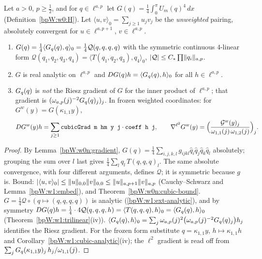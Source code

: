 \begin{proposition}\label{bpW:w1:gradient-identity}
Let $a>0$, $p\ge\frac12$, and for $q\in\ell^{a,p}$ let $G(q)=\frac14\int_0^\pi U_m(q)^4\,dx$ (Definition~\ref{bpW:w0:H}).
Let $\langle u,v\rangle_0=\sum_{j\ge1}u_jv_j$ be the \emph{unweighted} pairing, absolutely convergent for
$u\in\ell^{a,p+1}$, $v\in\ell^{a,p}$.
\begin{enumerate}[label=(\roman*)]
\item $G(q)=\frac14\langle G_q(q),q\rangle_0=\frac14\mathcal Q(q,q,q,q)$ with the symmetric continuous $4$-linear form
  $\mathcal Q(q_1,q_2,q_3,q_4)=\langle T(q_1,q_2,q_3),q_4\rangle_0$, $\lvert \mathcal Q\rvert\le C_*\prod\lVert q_i\rVert_{a,p}$.
\item $G$ is real analytic on $\ell^{a,p}$ and $DG(q)h=\langle G_q(q),h\rangle_0$ for all $h\in\ell^{a,p}$.
\item $G_q(q)$ is \emph{not} the Riesz gradient of $G$ for the inner product of $\ell^{a,p}$; that gradient is
  $(\omega_{a,p}(j)^{-2}G_q(q)_j)_j$. In frozen weighted coordinates: for $G^w(y)=G(\kappa_{1,1}y)$,
  \[DG^w(y)h=\sum_{j\ge1}\texttt{cubicGrad m hm y j}\cdot\texttt{coeff h j},\qquad
  \nabla^{\ell^2}G^w(y)=\Bigl(\frac{\mathcal G^w(y)_j}{\omega_{1,1}(j)\,\omega_{1,2}(j)}\Bigr)_j.\]
\end{enumerate}
\end{proposition}

\begin{proof}
\label{stepW:w1:quartic}
By Lemma~\ref{bpW:w0n:gradient}, $G(q)=\frac14\sum_{i,j,k,l}g_{ijkl}\hat q_i\hat q_j\hat q_k\hat q_l$ absolutely; grouping
the sum over $l$ last gives $\frac14\sum_lq_l\,T(q,q,q)_l$. The same absolute convergence, with four different
arguments, defines $\mathcal Q$; it is symmetric because $g$ is. Bound: $\lvert \langle u,v\rangle_0\rvert\le
\lVert u\rVert_{0,0}\lVert v\rVert_{0,0}\le\lVert u\rVert_{a,p+1}\lVert v\rVert_{a,p}$ (Cauchy--Schwarz and Lemma~\ref{bpW:w1:embed}), and
Theorem~\ref{bpW:w0n:cubic-bound}.
\label{stepW:w1:gradder}
$G=\frac14\mathcal Q\circ(q\mapsto(q,q,q,q))$ is analytic (\ref{bpW:w1:ext-analytic}), and by symmetry
$DG(q)h=\frac14\cdot4\mathcal Q(q,q,q,h)=\langle T(q,q,q),h\rangle_0=\langle G_q(q),h\rangle_0$
(Theorem~\ref{bpW:w1:trilinear}(iv)).
\label{stepW:w1:gradw}
$\langle G_q(q),h\rangle_0=\sum_j\omega_{a,p}(j)^2\bigl(\omega_{a,p}(j)^{-2}G_q(q)_j\bigr)h_j$ identifies the Riesz
gradient. For the frozen form substitute $q=\kappa_{1,1}y$, $h\mapsto\kappa_{1,1}h$ and
Corollary~\ref{bpW:w1:cubic-analytic}(iv); the $\ell^2$ gradient is read off from
$\sum_jG_q(\kappa_{1,1}y)_j\,h_j/\omega_{1,1}(j)$.
\end{proof}


